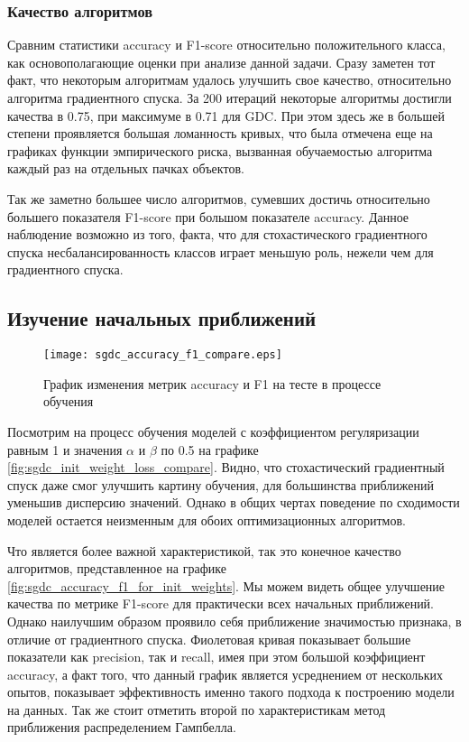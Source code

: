 \documentclass{article}
\begin{document}
        \subsubsection{Качество алгоритмов}
        
            Сравним статистики accuracy и F1-score относительно положительного класса, как основополагающие оценки при анализе данной задачи.
            Сразу заметен тот факт, что некоторым алгоритмам удалось улучшить свое качество, относительно алгоритма градиентного спуска. За 200 итераций некоторые алгоритмы достигли качества в 0.75, при максимуме в 0.71 для GDC. При этом здесь же в большей степени проявляется большая ломанность кривых, что была отмечена еще на графиках функции эмпирического риска, вызванная обучаемостью алгоритма каждый раз на отдельных пачках объектов. 

            Так же заметно большее число алгоритмов, сумевших достичь относительно большего показателя F1-score при большом показателе accuracy. Данное наблюдение возможно из того, факта, что для стохастического градиентного спуска несбалансированность классов играет меньшую роль, нежели чем для градиентного спуска.


    \subsection{Изучение начальных приближений}

\begin{wrapfigure}[28]{l}{0.5\textwidth}
    \centering
    \texttt{[image: sgdc\_accuracy\_f1\_compare.eps]}
    \caption{График изменения метрик accuracy и F1 на тесте в процессе обучения}
    \label{fig:sgdc_accuracy_f1_compare}
\end{wrapfigure}
        Посмотрим на процесс обучения моделей с коэффициентом регуляризации равным 1 и значения $\alpha$ и $\beta$ по 0.5 на графике \ref{fig:sgdc_init_weight_loss_compare}. Видно, что стохастический градиентный спуск даже смог улучшить картину обучения, для большинства приближений уменьшив дисперсию значений. Однако в общих чертах поведение по сходимости моделей остается неизменным для обоих оптимизационных алгоритмов. 

        Что является более важной характеристикой, так это конечное качество алгоритмов, представленное на графике \ref{fig:sgdc_accuracy_f1_for_init_weights}. Мы можем видеть общее улучшение качества по метрике F1-score для практически всех начальных приближений. Однако наилучшим образом проявило себя приближение значимостью признака, в отличие от градиентного спуска.
        Фиолетовая кривая показывает большие показатели как precision, так и recall, имея при этом большой коэффициент accuracy, а факт того, что данный график является усреднением от нескольких опытов, показывает эффективность именно такого подхода к построению модели на данных. Так же стоит отметить второй по характеристикам метод приближения распределением Гампбелла.
   
\end{document}
